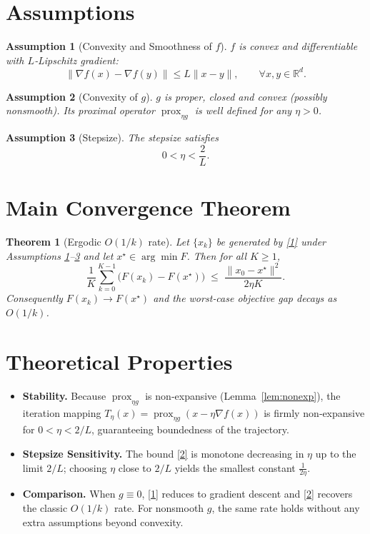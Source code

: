 \documentclass{article}
\newtheorem{theorem}{Theorem}
\newtheorem{assumption}{Assumption}
\newcommand{\prox}{\operatorname{prox}}
\newcommand{\R}{\mathbb{R}}
\begin{document}
\newpage
\section*{Assumptions}
\begin{assumption}[Convexity and Smoothness of $f$]\label{as:convexsmooth}
$f$ is convex and differentiable with $L$‑Lipschitz gradient:
\[
\|\nabla f(x)-\nabla f(y)\|\le L\|x-y\|,\qquad\forall x,y\in\R^{d}.
\]
\end{assumption}

\begin{assumption}[Convexity of $g$]\label{as:gconvex}
$g$ is proper, closed and convex (possibly nonsmooth). Its proximal operator $\prox_{\eta g}$ is well defined for any $\eta>0$.
\end{assumption}

\begin{assumption}[Stepsize]\label{as:stepsize}
The stepsize satisfies
\[
0<\eta<\frac{2}{L}.
\]
\end{assumption}

\section*{Main Convergence Theorem}
\begin{theorem}[Ergodic $O(1/k)$ rate]\label{thm:rate}
Let $\{x_{k}\}$ be generated by \eqref{1} under Assumptions \ref{as:convexsmooth}–\ref{as:stepsize} and let $x^{\star}\in\arg\min F$. Then for all $K\ge1$,
\[
\frac{1}{K}\sum_{k=0}^{K-1}\bigl(F(x_{k})-F(x^{\star})\bigr)
\;\le\;
\frac{\|x_{0}-x^{\star}\|^{2}}{2\eta K}.
\tag{2}
\]
Consequently $F(x_{k})\to F(x^{\star})$ and the worst‑case objective gap decays as $O(1/k)$.
\end{theorem}

\section*{Theoretical Properties}
\begin{itemize}
\item \textbf{Stability.} Because $\prox_{\eta g}$ is non‑expansive (Lemma~\ref{lem:nonexp}), the iteration mapping $T_{\eta}(x)=\prox_{\eta g}(x-\eta\nabla f(x))$ is firmly non‑expansive for $0<\eta<2/L$, guaranteeing boundedness of the trajectory.
\item \textbf{Stepsize Sensitivity.} The bound \eqref{2} is monotone decreasing in $\eta$ up to the limit $2/L$; choosing $\eta$ close to $2/L$ yields the smallest constant $\frac{1}{2\eta}$.
\item \textbf{Comparison.} When $g\equiv0$, \eqref{1} reduces to gradient descent and \eqref{2} recovers the classic $O(1/k)$ rate. For nonsmooth $g$, the same rate holds without any extra assumptions beyond convexity.
\end{itemize}
\end{document}
